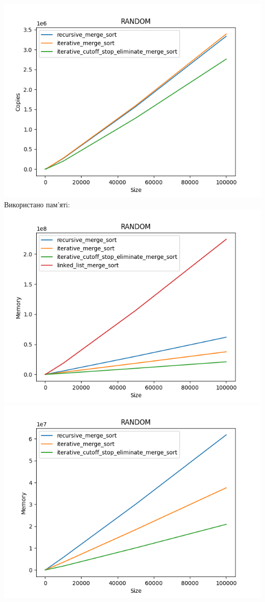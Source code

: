 \documentclass{article}
\begin{document}
        \includegraphics[scale=0.5]{random_Copies_3_sorts_6_numbers_50_100to100000.png}
    \newline
    Використано пам’ятi:
    \newline
        \includegraphics[scale=0.5]{random_Memory_4_sorts_6_numbers_50_100to100000.png}
        \includegraphics[scale=0.5]{random_Memory_3_sorts_6_numbers_50_100to100000.png}
    \newpage
\end{document}
